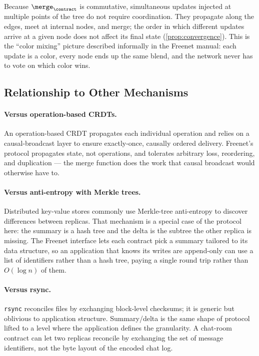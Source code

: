 Because $\merge_\contract$ is commutative, simultaneous updates injected at multiple points of the tree do not require coordination. They propagate along the edges, meet at internal nodes, and merge; the order in which different updates arrive at a given node does not affect its final state (\cref{prop:convergence}). This is the ``color mixing'' picture described informally in the Freenet manual: each update is a color, every node ends up the same blend, and the network never has to vote on which color wins.

\subsection{Relationship to Other Mechanisms}

\paragraph{Versus operation-based CRDTs.} An operation-based CRDT \citep{shapiro2011crdt} propagates each individual operation and relies on a causal-broadcast layer to ensure exactly-once, causally ordered delivery. Freenet's protocol propagates state, not operations, and tolerates arbitrary loss, reordering, and duplication --- the merge function does the work that causal broadcast would otherwise have to.

\paragraph{Versus anti-entropy with Merkle trees.} Distributed key-value stores commonly use Merkle-tree anti-entropy \citep{decandia2007dynamo} to discover differences between replicas. That mechanism is a special case of the protocol here: the summary is a hash tree and the delta is the subtree the other replica is missing. The Freenet interface lets each contract pick a summary tailored to its data structure, so an application that knows its writes are append-only can use a list of identifiers rather than a hash tree, paying a single round trip rather than $O(\log n)$ of them.

\paragraph{Versus rsync.} \texttt{rsync} \citep{tridgell1999rsync} reconciles files by exchanging block-level checksums; it is generic but oblivious to application structure. Summary/delta is the same shape of protocol lifted to a level where the application defines the granularity. A chat-room contract can let two replicas reconcile by exchanging the set of message identifiers, not the byte layout of the encoded chat log.
